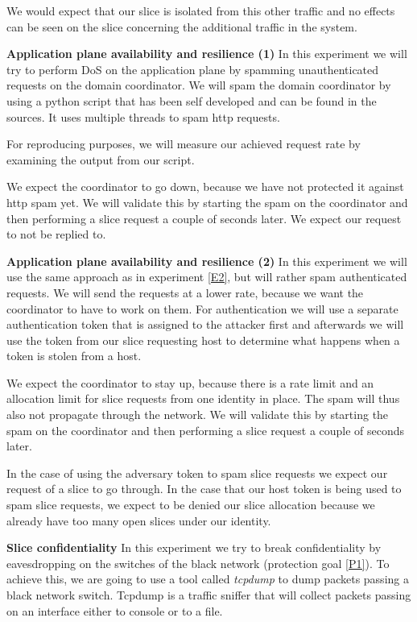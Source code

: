 \begin{description}[style=multiline, labelwidth=0.7cm]
    We would expect that our slice is isolated from this other traffic and no effects can be seen on the slice concerning the additional traffic in the system.

    \item[\namedlabel{E2}{E2}] \textbf{Application plane availability and resilience (1)} In this experiment we will try to perform DoS on the application plane by spamming unauthenticated requests on the domain coordinator. We will spam the domain coordinator by using a python script that has been self developed and can be found in the sources. It uses multiple threads to spam http requests.

    For reproducing purposes, we will measure our achieved request rate by examining the output from our script.

    We expect the coordinator to go down, because we have not protected it against http spam yet. We will validate this by starting the spam on the coordinator and then performing a slice request a couple of seconds later. We expect our request to not be replied to.

    \item[\namedlabel{E3}{E3}] \textbf{Application plane availability and resilience (2)} In this experiment we will use the same approach as in experiment \ref{E2}, but will rather spam authenticated requests. We will send the requests at a lower rate, because we want the coordinator to have to work on them. For authentication we will use a separate authentication token that is assigned to the attacker first and afterwards we will use the token from our slice requesting host to determine what happens when a token is stolen from a host.

    We expect the coordinator to stay up, because there is a rate limit and an allocation limit for slice requests from one identity in place. The spam will thus also not propagate through the network. We will validate this by starting the spam on the coordinator and then performing a slice request a couple of seconds later.

    In the case of using the adversary token to spam slice requests we expect our request of a slice to go through. In the case that our host token is being used to spam slice requests, we expect to be denied our slice allocation because we already have too many open slices under our identity.

    \item[\namedlabel{E4}{E4}] \textbf{Slice confidentiality} In this experiment we try to break confidentiality by eavesdropping on the switches of the black network (protection goal \ref{P1}). To achieve this, we are going to use a tool called \textit{tcpdump} \cite{tcpdump} to dump packets passing a black network switch. Tcpdump is a traffic sniffer that will collect packets passing on an interface either to console or to a file.


\end{description}
